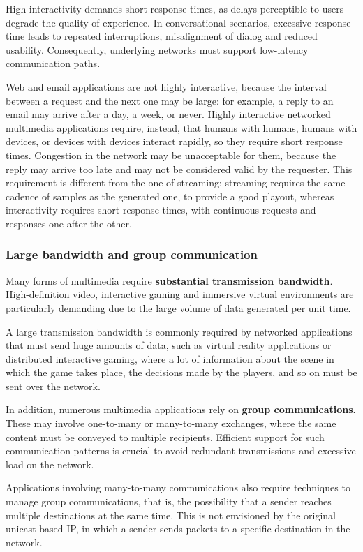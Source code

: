 \documentclass[11pt,a4paper,openany]{report}
\begin{document}
High interactivity demands short response times, as delays perceptible to users degrade the quality of experience. In conversational scenarios, excessive response time leads to repeated interruptions, misalignment of dialog and reduced usability. Consequently, underlying networks must support low-latency communication paths.

Web and email applications are not highly interactive, because the interval between a request and the next one may be large: for example, a reply to an email may arrive after a day, a week, or never. Highly interactive networked multimedia applications require, instead, that humans with humans, humans with devices, or devices with devices interact rapidly, so they require short response times. Congestion in the network may be unacceptable for them, because the reply may arrive too late and may not be considered valid by the requester. This requirement is different from the one of streaming: streaming requires the same cadence of samples as the generated one, to provide a good playout, whereas interactivity requires short response times, with continuous requests and responses one after the other.

\subsubsection*{Large bandwidth and group communication}

Many forms of multimedia require \textbf{substantial transmission bandwidth}. High-definition video, interactive gaming and immersive virtual environments are particularly demanding due to the large volume of data generated per unit time.

A large transmission bandwidth is commonly required by networked applications that must send huge amounts of data, such as virtual reality applications or distributed interactive gaming, where a lot of information about the scene in which the game takes place, the decisions made by the players, and so on must be sent over the network.

In addition, numerous multimedia applications rely on \textbf{group communications}. These may involve one-to-many or many-to-many exchanges, where the same content must be conveyed to multiple recipients. Efficient support for such communication patterns is crucial to avoid redundant transmissions and excessive load on the network.

Applications involving many-to-many communications also require techniques to manage group communications, that is, the possibility that a sender reaches multiple destinations at the same time. This is not envisioned by the original unicast-based IP, in which a sender sends packets to a specific destination in the network.
\end{document}
